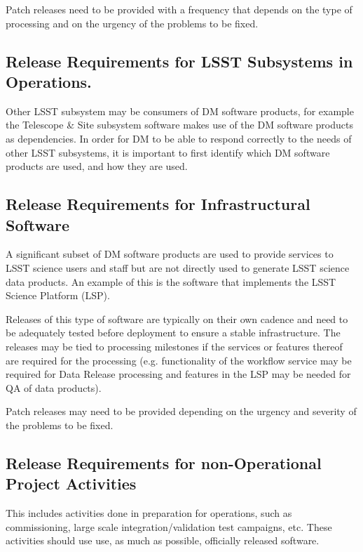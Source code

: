 Patch releases need to be provided with a frequency that depends on the type of processing
and on the urgency of the problems to be fixed.


\subsection{Release Requirements for \gls{LSST} Subsystems in \gls{Operations}.} \label{sec:otherreqs}

Other \gls{LSST} subsystem may be consumers of \gls{DM} software products, for example the Telescope \& Site subsystem software makes use of the \gls{DM} software products as dependencies. 
In order for \gls{DM} to be able to respond correctly to the needs of other \gls{LSST} subsystems, it is important to first identify which \gls{DM} software products are used, and how they are used.


\subsection{Release Requirements for Infrastructural Software} \label{sec:infreqs}

A significant subset of \gls{DM} software products are used to provide services to \gls{LSST} science users and staff but are not directly used to generate \gls{LSST} science data products. An example of this is the software that implements the \gls{LSST} \gls{Science Platform} (\gls{LSP}).

Releases of this type of software are typically on their own cadence and need to be adequately tested before deployment to ensure a stable infrastructure. 
The releases may be tied to processing milestones if the services or features thereof are required for the processing (e.g. functionality of the workflow service may be required for \gls{Data Release} processing and features in the \gls{LSP} may be needed for \gls{QA} of data products).

Patch releases may need to be provided depending on the urgency and severity of the problems to be fixed.


\subsection{Release Requirements for non-Operational Project Activities} \label{sec:nonopsreqs}

This includes activities done in preparation for operations, such as commissioning, 
large scale integration/validation test campaigns, etc. These activities should use use,  as much as possible,  officially released software.

